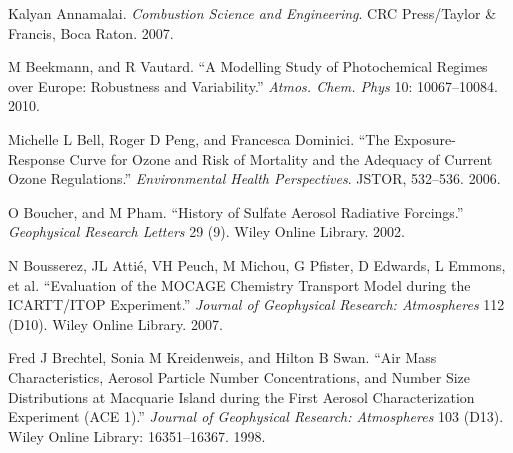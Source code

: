 \documentclass[9pt]{report}
\begin{document}
{%
\begin{thebibliography}{34}%
\label{sec-bibliography}%

Kalyan Annamalai. \emph{Combustion Science and Engineering}. CRC Press/Taylor \& Francis, Boca Raton. 2007.\label{annamalai2007combustion}%

M Beekmann, and R Vautard. \textquotedblleft{}A Modelling Study of Photochemical Regimes over Europe: Robustness and Variability.\textquotedblright{} \emph{Atmos. Chem. Phys} 10: 10067–10084. 2010.\label{beekmann2010modelling}%

Michelle L Bell, Roger D Peng, and Francesca Dominici. \textquotedblleft{}The Exposure-Response Curve for Ozone and Risk of Mortality and the Adequacy of Current Ozone Regulations.\textquotedblright{} \emph{Environmental Health Perspectives}. JSTOR, 532–536. 2006.\label{bell2006exposure}%

O Boucher, and M Pham. \textquotedblleft{}History of Sulfate Aerosol Radiative Forcings.\textquotedblright{} \emph{Geophysical Research Letters} 29 (9). Wiley Online Library. 2002.\label{boucher2002history}%

N Bousserez, JL Atti\'{e}, VH Peuch, M Michou, G Pfister, D Edwards, L Emmons, et al. \textquotedblleft{}Evaluation of the MOCAGE Chemistry Transport Model during the ICARTT/ITOP Experiment.\textquotedblright{} \emph{Journal of Geophysical Research: Atmospheres} 112 (D10). Wiley Online Library. 2007.\label{bousserez2007evaluation}%

Fred J Brechtel, Sonia M Kreidenweis, and Hilton B Swan. \textquotedblleft{}Air Mass Characteristics, Aerosol Particle Number Concentrations, and Number Size Distributions at Macquarie Island during the First Aerosol Characterization Experiment (ACE 1).\textquotedblright{} \emph{Journal of Geophysical Research: Atmospheres} 103 (D13). Wiley Online Library: 16351–16367. 1998.\label{brechtel1998air}%


\end{thebibliography}}
\end{document}
